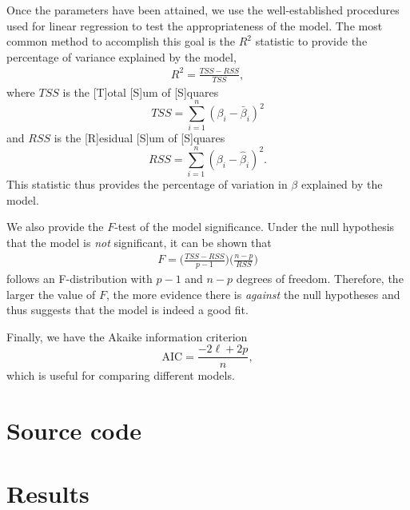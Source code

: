 Once the parameters have been attained, we use the well-established procedures used for linear regression to test the appropriateness of the model.  The most common method to accomplish this goal is the $R^2$ statistic to provide the percentage of variance explained by the model,
\begin{align*}
  R^2 = \frac{TSS - RSS}{TSS},
\end{align*}
where $TSS$ is the [T]otal [S]um of [S]quares
$$TSS = \sum_{i=1}^n \left( \beta_i - \bar{\beta}_i \right)^2$$
and $RSS$ is the [R]esidual [S]um of [S]quares
$$RSS = \sum_{i=1}^n \left( \beta_i - \hat{\beta}_i \right)^2.$$
This statistic thus provides the percentage of variation in $\beta$ explained by the model.

We also provide the $F$-test of the model significance.  Under the null hypothesis that the model is \emph{not} significant, it can be shown that
\begin{align*}
  F = \Bigg( \frac{TSS - RSS}{p - 1} \Bigg) \Bigg( \frac{n-p}{RSS} \Bigg)
\end{align*}
follows an F-distribution with $p-1$ and $n-p$ degrees of freedom.  Therefore, the larger the value of $F$, the more evidence there is \emph{against} the null hypotheses and thus suggests that the model is indeed a good fit.

Finally, we have the Akaike information criterion
$$\mathrm{AIC} = \frac{-2\ell + 2p}{n},$$
which is useful for comparing different models.

\section{Source code}


\section{Results}

\newpage


